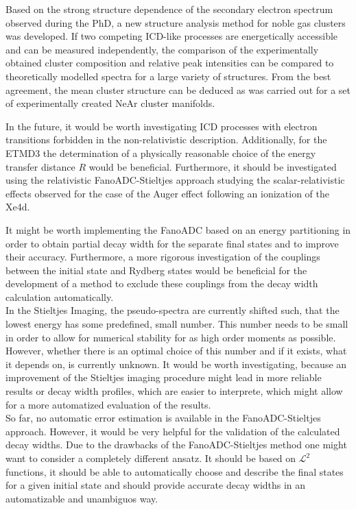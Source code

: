 Based on the strong structure dependence of the secondary electron spectrum
observed during the PhD, a new
structure analysis method for noble gas clusters was developed. If two
competing ICD-like processes are energetically accessible and can be measured
independently, the comparison of the experimentally obtained cluster
composition and relative peak intensities can be compared to theoretically
modelled spectra for a large variety of structures. From the best agreement,
the mean cluster structure can be deduced as was carried out for
a set of experimentally created NeAr cluster manifolds.

In the future, it would be worth investigating \ac{ICD} processes with electron
transitions forbidden in the non-relativistic description.
Additionally, for the ETMD3 the determination of a physically reasonable
choice of the energy transfer distance $R$ would be beneficial.
Furthermore, it should be investigated using the relativistic
FanoADC-Stieltjes approach studying the scalar-relativistic effects observed
for the case of the Auger effect following an ionization of the Xe4d.

It might be worth implementing the FanoADC based on an energy partitioning in
order to obtain partial decay width for the separate final states and to
improve their accuracy.
Furthermore, a more rigorous investigation of the couplings between the
initial state and Rydberg states would be beneficial for the development
of a method to exclude these couplings from the decay width calculation
automatically.\\
In the Stieltjes Imaging, the pseudo-spectra are currently shifted such,
that the lowest energy has some predefined, small number. This number needs
to be small in order to allow for numerical stability for as high order
moments as possible. However, whether there is an optimal choice of this
number and if it exists, what it depends on, is currently unknown.
It would be worth investigating, because an improvement of the Stieltjes
imaging procedure might lead in more reliable results or decay width profiles,
which are easier to interprete, which might allow for a more automatized
evaluation of the results.\\
So far, no automatic error estimation is available in the FanoADC-Stieltjes
approach. However, it would be very helpful for the validation of the
calculated decay widths.
Due to the drawbacks of the FanoADC-Stieltjes method one might want
to consider a completely different ansatz. It should be based on $\mathcal{L}^2$
functions, it should be able to automatically choose and describe the final
states for a given initial state and should provide accurate decay widths
in an automatizable and unambiguos way.


